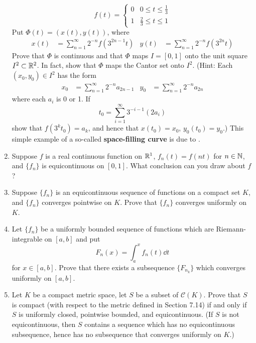 \documentclass[../psets.tex]{subfiles}
\begin{document}
\begin{enumerate}[label={\textbf{\arabic*.}}]
    \begin{equation*}
        f(t) =
        \begin{cases}
            0 & 0\leq t\leq\frac{1}{3}\\
            1 & \frac{2}{3}\leq t\leq 1
        \end{cases}
    \end{equation*}
    Put $\Phi(t)=(x(t),y(t))$, where
    \begin{align*}
        x(t) &= \sum_{n=1}^\infty 2^{-n}f(3^{2n-1}t)&
        y(t) &= \sum_{n=1}^\infty 2^{-n}f(3^{2n}t)
    \end{align*}
    Prove that $\Phi$ is continuous and that $\Phi$ maps $I=[0,1]$ onto the unit square $I^2\subset\mathbb{R}^2$. In fact, show that $\Phi$ maps the Cantor set onto $I^2$. (Hint: Each $(x_0,y_0)\in I^2$ has the form
    \begin{align*}
        x_0 &= \sum_{n=1}^\infty 2^{-n}a_{2n-1}&
        y_0 &= \sum_{n=1}^\infty 2^{-n}a_{2n}
    \end{align*}
    where each $a_i$ is 0 or 1. If
    \begin{equation*}
        t_0 = \sum_{i=1}^\infty 3^{-i-1}(2a_i)
    \end{equation*}
    show that $f(3^kt_0)=a_k$, and hence that $x(t_0)=x_0$, $y_0(t_0)=y_0$.) This simple example of a so-called \textbf{space-filling curve} is due to \textcite{bib:Schoenberg}.
    \item Suppose $f$ is a real continuous function on $\mathbb{R}^1$, $f_n(t)=f(nt)$ for $n\in\mathbb{N}$, and $\{f_n\}$ is equicontinuous on $[0,1]$. What conclusion can you draw about $f$?
    \item Suppose $\{f_n\}$ is an equicontinuous sequence of functions on a compact set $K$, and $\{f_n\}$ converges pointwise on $K$. Prove that $\{f_n\}$ converges uniformly on $K$.
    \item Let $\{f_n\}$ be a uniformly bounded sequence of functions which are Riemann-integrable on $[a,b]$ and put
    \begin{equation*}
        F_n(x) = \int_a^xf_n(t)\dd{t}
    \end{equation*}
    for $x\in[a,b]$. Prove that there exists a subsequence $\{F_{n_k}\}$ which converges uniformly on $[a,b]$.
    \item Let $K$ be a compact metric space, let $S$ be a subset of $\mathscr{C}(K)$. Prove that $S$ is compact (with respect to the metric defined in Section 7.14) if and only if $S$ is uniformly closed, pointwise bounded, and equicontinuous. (If $S$ is not equicontinuous, then $S$ contains a sequence which has no equicontinuous subsequence, hence has no subsequence that converges uniformly on $K$.)

\end{enumerate}
\end{document}
